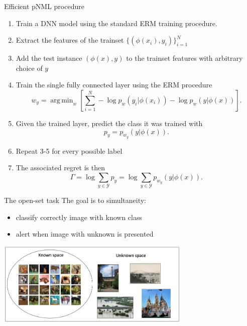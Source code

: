 \documentclass[aspectratio=169]{beamer}
\DeclareMathOperator*{\argmin}{arg\,min}
\begin{document}
\begin{frame}{Efficient pNML procedure}
\begin{enumerate}
\item Train a DNN model using the standard ERM training procedure.
\item  Extract the features of the trainset $ \{(\phi(x_i),y_i)\}_{i=1}^N$
\item Add the test instance  $(\phi(x),y)$ to the trainset features with arbitrary choice of $y$
\item Train the single fully connected layer using the ERM procedure
    \begin{equation}
    w_{y} = \argmin_{w} \left[\sum_{i=1}^N  - \log p_{w}\left(y_i|\phi(x_i)\right) 
    - \log p_{w}\left(y|\phi(x)\right) \right].
    \end{equation}
\item Given the trained layer, predict the class it was trained with
\begin{equation}
    p_{y} = p_{w_{y}}(y|\phi(x)).
\end{equation}
\item Repeat 3-5 for every possible label
\item The associated regret is then 
    \begin{equation}
    \Gamma = \log \sum_{y \in \mathcal{Y}} p_{y} 
    = \log \sum_{y \in \mathcal{Y}}  p_{w_{y}}(y|\phi(x)). 
    \end{equation}
\end{enumerate}
\end{frame}


\begin{frame}{The open-set task}
The goal is to simultaneity:
\begin{itemize}
\item classify correctly image with known class
\item alert when image with unknown is presented
\end{itemize}
\centering
\includegraphics[width=0.7\textwidth]{figures/openset_task.jpg}
\end{frame}
\end{document}
